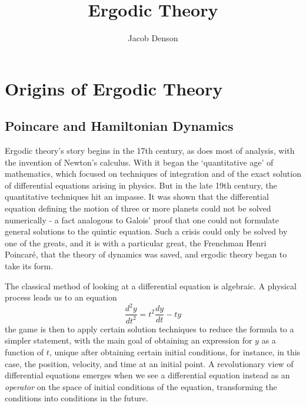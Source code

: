 


\title{Ergodic Theory}
\author{Jacob Denson}




\maketitle



\chapter{Origins of Ergodic Theory}

\section{Poincare and Hamiltonian Dynamics}

Ergodic theory's story begins in the 17th century, as does most of analysis, with the invention of Newton's calculus. With it began the `quantitative age' of mathematics, which focused on techniques of integration and of the exact solution of differential equations arising in physics. But in the late 19th century, the quantitative techniques hit an impasse. It was shown that the differential equation defining the motion of three or more planets could not be solved numerically - a fact analogous to Galois' proof that one could not formulate general solutions to the quintic equation. Such a crisis could only be solved by one of the greats, and it is with a particular great, the Frenchman Henri Poincar\'{e}, that the theory of dynamics was saved, and ergodic theory began to take its form.

The classical method of looking at a differential equation is algebraic. A physical process leads us to an equation
%
\[ \frac{d^2 y}{dt^2} = t^2 \frac{dy}{dt} - ty \]
%
the game is then to apply certain solution techniques to reduce the formula to a simpler statement, with the main goal of obtaining an expression for $y$ as a function of $t$, unique after obtaining certain initial conditions, for instance, in this case, the position, velocity, and time at an initial point. A revolutionary view of differential equations emerges when we see a differential equation instead as an {\it operator} on the space of initial conditions of the equation, transforming the conditions into conditions in the future.

